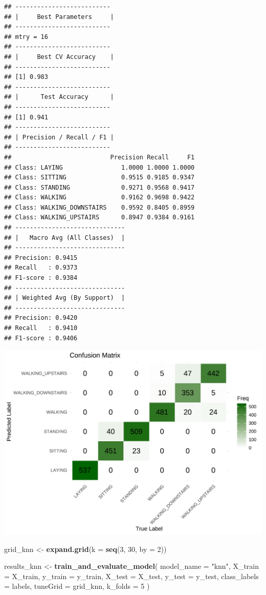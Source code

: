 \documentclass[
]{article}
\newenvironment{Shaded}{\begin{snugshade}}{\end{snugshade}}
\newcommand{\AttributeTok}[1]{\textcolor[rgb]{0.13,0.29,0.53}{#1}}
\newcommand{\DecValTok}[1]{\textcolor[rgb]{0.00,0.00,0.81}{#1}}
\newcommand{\FunctionTok}[1]{\textcolor[rgb]{0.13,0.29,0.53}{\textbf{#1}}}
\newcommand{\NormalTok}[1]{#1}
\newcommand{\OtherTok}[1]{\textcolor[rgb]{0.56,0.35,0.01}{#1}}
\newcommand{\StringTok}[1]{\textcolor[rgb]{0.31,0.60,0.02}{#1}}
\begin{document}
\begin{verbatim}
## --------------------------
## |     Best Parameters     |
## --------------------------
## mtry = 16
## --------------------------
## |     Best CV Accuracy    |
## --------------------------
## [1] 0.983
## --------------------------
## |      Test Accuracy      |
## --------------------------
## [1] 0.941
## --------------------------
## | Precision / Recall / F1 |
## --------------------------
##                           Precision Recall     F1
## Class: LAYING                1.0000 1.0000 1.0000
## Class: SITTING               0.9515 0.9185 0.9347
## Class: STANDING              0.9271 0.9568 0.9417
## Class: WALKING               0.9162 0.9698 0.9422
## Class: WALKING_DOWNSTAIRS    0.9592 0.8405 0.8959
## Class: WALKING_UPSTAIRS      0.8947 0.9384 0.9161
## ------------------------------
## |   Macro Avg (All Classes)  |
## ------------------------------
## Precision: 0.9415
## Recall   : 0.9373
## F1-score : 0.9384
## ------------------------------
## | Weighted Avg (By Support)  |
## ------------------------------
## Precision: 0.9420
## Recall   : 0.9410
## F1-score : 0.9406
\end{verbatim}

\includegraphics{report_files/figure-latex/unnamed-chunk-28-1.pdf}

\begin{Shaded}
\begin{Highlighting}[]
\NormalTok{grid\_knn }\OtherTok{\textless{}{-}} \FunctionTok{expand.grid}\NormalTok{(}\AttributeTok{k =} \FunctionTok{seq}\NormalTok{(}\DecValTok{3}\NormalTok{, }\DecValTok{30}\NormalTok{, }\AttributeTok{by =} \DecValTok{2}\NormalTok{))  }

\NormalTok{results\_knn }\OtherTok{\textless{}{-}} \FunctionTok{train\_and\_evaluate\_model}\NormalTok{(}
  \AttributeTok{model\_name =} \StringTok{"knn"}\NormalTok{,}
  \AttributeTok{X\_train =}\NormalTok{ X\_train, }
  \AttributeTok{y\_train =}\NormalTok{ y\_train,}
  \AttributeTok{X\_test =}\NormalTok{ X\_test, }
  \AttributeTok{y\_test =}\NormalTok{ y\_test,}
  \AttributeTok{class\_labels =}\NormalTok{ labels,}
  \AttributeTok{tuneGrid =}\NormalTok{ grid\_knn,}
  \AttributeTok{k\_folds =} \DecValTok{5}
\NormalTok{)}
\end{Highlighting}
\end{Shaded}
\end{document}
